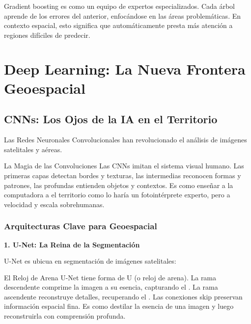 \documentclass[12pt,a4paper]{article}
\begin{document}
\begin{reflexion}
Gradient boosting es como un equipo de expertos especializados. Cada árbol aprende de los errores del anterior, enfocándose en las áreas problemáticas. En contexto espacial, esto significa que automáticamente presta más atención a regiones difíciles de predecir.
\end{reflexion}

\section{Deep Learning: La Nueva Frontera Geoespacial}

\subsection{CNNs: Los Ojos de la IA en el Territorio}

Las Redes Neuronales Convolucionales han revolucionado el análisis de imágenes satelitales y aéreas.

\begin{conceptbox}{La Magia de las Convoluciones}
Las CNNs imitan el sistema visual humano. Las primeras capas detectan bordes y texturas, las intermedias reconocen formas y patrones, las profundas entienden objetos y contextos. Es como enseñar a la computadora a  el territorio como lo haría un fotointérprete experto, pero a velocidad y escala sobrehumanas.
\end{conceptbox}

\subsubsection{Arquitecturas Clave para Geoespacial}

\textbf{1. U-Net: La Reina de la Segmentación}

U-Net es ubicua en segmentación de imágenes satelitales:

\begin{analogia}{El Reloj de Arena}
U-Net tiene forma de U (o reloj de arena). La rama descendente comprime la imagen a su esencia, capturando el . La rama ascendente reconstruye detalles, recuperando el . Las conexiones skip preservan información espacial fina. Es como destilar la esencia de una imagen y luego reconstruirla con comprensión profunda.
\end{analogia}
\end{document}
